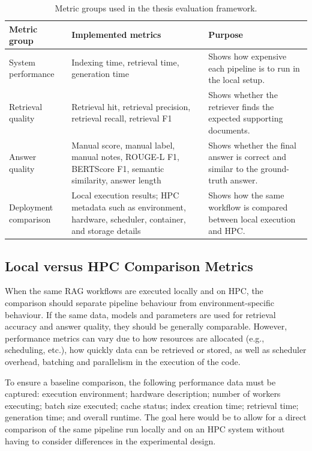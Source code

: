\begin{table}[htbp]
\centering
\small
\begin{tabularx}{\textwidth}{>{\raggedright\arraybackslash}p{}>{\raggedright\arraybackslash}X>{\raggedright\arraybackslash}p{}}
\toprule
\textbf{Metric group} & \textbf{Implemented metrics} & \textbf{Purpose} \\
\midrule
System performance & Indexing time, retrieval time, generation time & Shows how expensive each pipeline is to run in the local setup. \\
Retrieval quality & Retrieval hit, retrieval precision, retrieval recall, retrieval F1 & Shows whether the retriever finds the expected supporting documents. \\
Answer quality & Manual score, manual label, manual notes, ROUGE-L F1, BERTScore F1, semantic similarity, answer length & Shows whether the final answer is correct and similar to the ground-truth answer. \\
Deployment comparison & Local execution results; \ac{HPC} metadata such as environment, hardware, scheduler, container, and storage details & Shows how the same workflow is compared between local execution and \ac{HPC}. \\
\bottomrule
\end{tabularx}
\caption{Metric groups used in the thesis evaluation framework.}
\label{tab:evaluation-metric-groups}
\end{table}

\subsection{Local versus HPC Comparison Metrics}

When the same \ac{RAG} workflows are executed locally and on \ac{HPC}, the comparison should separate pipeline behaviour from environment-specific behaviour. If the same data, models and parameters are used for retrieval accuracy and answer quality, they should be generally comparable. However, performance metrics can vary due to how resources are allocated (e.g., scheduling, etc.), how quickly data can be retrieved or stored, as well as scheduler overhead, batching and parallelism in the execution of the code.

To ensure a baseline comparison, the following performance data must be captured: execution environment; hardware description; number of workers executing; batch size executed; cache status; index creation time; retrieval time; generation time; and overall runtime. The goal here would be to allow for a direct comparison of the same pipeline run locally and on an HPC system without having to consider differences in the experimental design.

